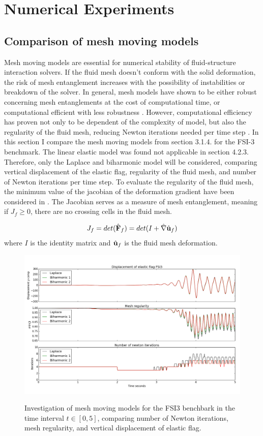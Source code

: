 

 \chapter{Numerical Experiments}

\section{Comparison of mesh moving models}
Mesh moving models are essential for numerical stability of fluid-structure interaction solvers. If the fluid mesh doesn't conform with the solid deformation, the risk of mesh entanglement increases with the possibility of instabilities or breakdown of the solver. In general, mesh models have shown to be either robust concerning mesh entanglements at the cost of computational time, or computational efficient with less robustness \cite{MM2016}. However, computational efficiency has proven not only to be dependent of the complexity of model, but also the regularity of the fluid mesh, reducing Newton iterations needed per time step \cite{Wickb}. In this section I compare the mesh moving models from section 3.1.4. for the FSI-3 benchmark. The linear elastic model was found not applicable in section 4.2.3. Therefore, only the Laplace and biharmonic model will be considered, comparing vertical displacement of the elastic flag, regularity of the fluid mesh, and number of Newton iterations per time step. To evaluate the regularity of the fluid mesh, the minimum value of the jacobian of the deformation gradient have been considered in \cite{Wickb}. The Jacobian serves as a measure of mesh entanglement, meaning if $J_f \geq 0$, there are no crossing cells in the fluid mesh. 

\begin{align*}
{J}_f = det(\hat{\mathbf{F}}_f) =  det(I + \hat{\nabla} \hat{\mathbf{u}}_f)
\end{align*}
where $I$ is the identity matrix and $ \hat{\mathbf{u}}_f$ is the fluid mesh deformation.  
\newpage
\begin{figure}[h!]
 	\centering
    \includegraphics[scale=0.4]{./Fig/minjcompare.png} \\
      \caption{Investigation of mesh moving models for the FSI3 benchbark in the time interval $t \in [0, 5]$, comparing number of Newton iterations, mesh regularity, and vertical displacement of elastic flag. }
      \label{fig:minjcomp}
\end{figure}

